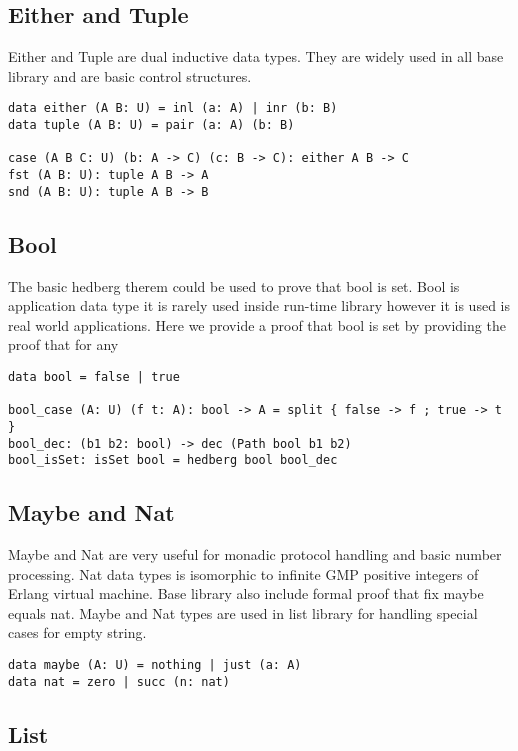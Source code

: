 \documentclass{article}
\begin{document}
\subsection{Either and Tuple}

Either and Tuple are dual inductive data types. They are widely used
in all base library and are basic control structures.

\begin{lstlisting}[mathescape=true]
data either (A B: U) = inl (a: A) | inr (b: B)
data tuple (A B: U) = pair (a: A) (b: B)

case (A B C: U) (b: A -> C) (c: B -> C): either A B -> C
fst (A B: U): tuple A B -> A
snd (A B: U): tuple A B -> B
\end{lstlisting}

\subsection{Bool}

The basic hedberg therem could be used to prove that bool is set.
Bool is application data type it is rarely used inside run-time library
however it is used is real world applications. Here we provide a proof
that bool is set by providing the proof that for any

\begin{lstlisting}[mathescape=true]
data bool = false | true

bool_case (A: U) (f t: A): bool -> A = split { false -> f ; true -> t }
bool_dec: (b1 b2: bool) -> dec (Path bool b1 b2)
bool_isSet: isSet bool = hedberg bool bool_dec
\end{lstlisting}

\subsection{Maybe and Nat}

Maybe and Nat are very useful for monadic protocol handling
and basic number processing. Nat data types is isomorphic
to infinite GMP positive integers of Erlang virtual machine.
Base library also include formal proof that fix maybe equals nat.
Maybe and Nat types are used in list library for handling special cases
for empty string.

\begin{lstlisting}[mathescape=true]
data maybe (A: U) = nothing | just (a: A)
data nat = zero | succ (n: nat)
\end{lstlisting}

\subsection{List}
\end{document}
